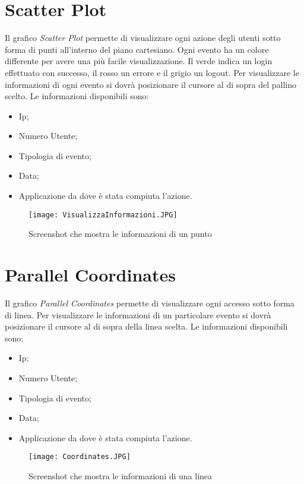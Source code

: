 \section{Scatter Plot}
Il grafico \textit{Scatter Plot} permette di visualizzare ogni azione degli utenti sotto forma di punti all'interno del piano cartesiano.
Ogni evento ha un colore differente per avere una più facile visualizzazione.
Il verde indica un login effettuato con successo, il rosso un errore e il grigio un logout.
Per visualizzare le informazioni di ogni evento si dovrà posizionare il cursore al di sopra del pallino scelto. Le informazioni disponibili sono:
\begin{itemize}
  \item Ip;
  \item Numero Utente;
  \item Tipologia di evento;
  \item Data;
  \item Applicazione da dove è stata compiuta l'azione.
\end{itemize}

\begin{figure}[H]
    \texttt{[image: VisualizzaInformazioni.JPG]}
    \caption{Screenshot che mostra le informazioni di un punto}
\end{figure}

\section{Parallel Coordinates}
Il grafico \textit{Parallel Coordinates} permette di visualizzare ogni accesso sotto forma di linea.
Per visualizzare le informazioni di un particolare evento si dovrà posizionare il cursore al di sopra della linea scelta. Le informazioni disponibili sono:
\begin{itemize}
  \item Ip;
  \item Numero Utente;
  \item Tipologia di evento;
  \item Data;
  \item Applicazione da dove è stata compiuta l'azione.
\end{itemize}

\begin{figure}[H]
    \texttt{[image: Coordinates.JPG]}
    \caption{Screenshot che mostra le informazioni di una linea}
\end{figure}

